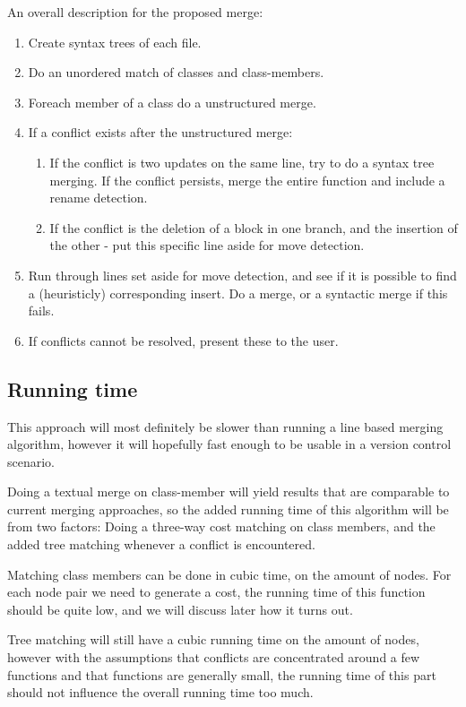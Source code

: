 \documentclass[11pt]{article}
\begin{document}
An overall description for the proposed merge:

\begin{enumerate}
    \item Create syntax trees of each file.
    \item Do an unordered match of classes and class-members.
    \item Foreach member of a class do a unstructured merge.
    \item If a conflict exists after the unstructured merge:
    \begin{enumerate}
        \item If the conflict is two updates on the same line, try to do a syntax tree merging. If the conflict persists, merge the entire function and include a rename detection.
        \item If the conflict is the deletion of a block in one branch, and the insertion of the other - put this specific line aside for move detection.
    \end{enumerate}
    \item Run through lines set aside for move detection, and see if it is possible to find a (heuristicly) corresponding insert. Do a merge, or a syntactic merge if this fails.
    \item If conflicts cannot be resolved, present these to the user.
\end{enumerate}

\subsection{Running time}
This approach will most definitely be slower than running a line based merging algorithm, however it will hopefully fast enough to be usable in a version control scenario.

Doing a textual merge on class-member will yield results that are comparable to current merging approaches, so the added running time of this algorithm will be from two factors: Doing a three-way cost matching on class members, and the added tree matching whenever a conflict is encountered.

Matching class members can be done in cubic time, on the amount of nodes. For each node pair we need to generate a cost, the running time of this function should be quite low, and we will discuss later how it turns out. 

Tree matching will still have a cubic running time on the amount of nodes, however with the assumptions that conflicts are concentrated around a few functions and that functions are generally small, the running time of this part should not influence the overall running time too much.
\end{document}
